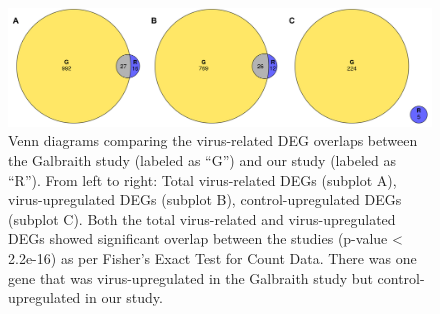 \documentclass[11pt,a4paper,oldfontcommands,openany]{memoir}
\numberwithin{equation}{section} %
\begin{document}
\begin{figure}[H]
\begin{framed}
  \includegraphics[width=\textwidth]{Images/GRVenn}
\end{framed}
  \caption{Venn diagrams comparing the virus-related DEG overlaps between the Galbraith study (labeled as ``G'') and our study (labeled as ``R''). From left to right: Total virus-related DEGs (subplot A), virus-upregulated DEGs (subplot B), control-upregulated DEGs (subplot C). Both the total virus-related and virus-upregulated DEGs showed significant overlap between the studies (p-value < 2.2e-16) as per Fisher's Exact Test for Count Data. There was one gene that was virus-upregulated in the Galbraith study but control-upregulated in our study.}
  \label{fig:GRVenn}
\end{figure}



\end{document}
